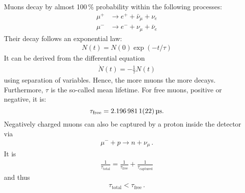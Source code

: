 Muons decay by almost 100\,\% probability within the following processes:
\begin{align}
	\mu^+&\longrightarrow e^++\bar{\nu}_\mu+\nu_e\\
	\mu^-&\longrightarrow e^-+\nu_\mu+\bar{\nu}_e
\end{align}
Their decay follows an exponential law:
\begin{align}
	N(t)=N(0)\exp(-t/\tau)
\end{align}
It can be derived from the differential equation
\begin{align}
	\dot{N}(t)=-\frac{1}{\tau}N(t)
\end{align}
using separation of variables.
Hence, the more muons the more decays.
Furthermore, $\tau$ is the so-called mean lifetime.
For free muons, positive or negative, it is\cite{pdg}:
\begin{equation}
	\tau_\text{free} = \SI{2.1969811 \pm 0.0000022}{\micro\second}.
\end{equation}
Negatively charged muons can also be captured by a proton inside the detector via
\begin{align}
	\mu^-+p \longrightarrow n+\nu_\mu\,.
\end{align}
It is 
\begin{align}
	\frac{1}{\tau_\text{total}}=\frac{1}{\tau_\text{free}}+\frac{1}{\tau_\text{captured}}
\end{align}
and thus
\begin{align}
	\tau_\text{total}<\tau_\text{free}\,.
\end{align}

